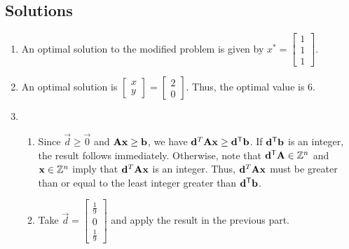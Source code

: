 \subsection*{Solutions}\label{solutions-10}

\begin{enumerate}
\def\labelenumi{\arabic{enumi}.}
\item
  An optimal solution to the modified problem is given by
  \(x^* = \begin{bmatrix} 1\\1\\1 \end{bmatrix}\).
\item
  An optimal solution is
  \(\begin{bmatrix} x\\y \end{bmatrix} = \begin{bmatrix} 2 \\ 0\end{bmatrix}\).
  Thus, the optimal value is \(6\).
\item
  \begin{enumerate}
  \def\labelenumii{\alph{enumii}.}
  \item
    Since \(\vec{d} \geq \vec{0}\) and \(\mathbf{A}\mathbf{x} \geq \mathbf{b}\),
    we have \(\mathbf{d}^T\mathbf{A} \mathbf{x} \geq \mathbf{d}^{\mathsf{T}}\mathbf{b}\). If
    \(\mathbf{d}^{\mathsf{T}}\mathbf{b}\) is an integer, the result follows immediately.
    Otherwise, note that \(\mathbf{d}^{\mathsf{T}}\mathbf{A} \in {\mathbb{Z}}^n\) and
    \(\mathbf{x}\in {\mathbb{Z}}^n\) imply that \(\mathbf{d}^T\mathbf{A} \mathbf{x}\) is an
    integer. Thus, \(\mathbf{d}^T\mathbf{A} \mathbf{x}\) must be greater than or
    equal to the least integer greater than \(\mathbf{d}^{\mathsf{T}}\mathbf{b}\).
  \item
    Take
    \(\vec{d} = \begin{bmatrix} \frac{1}{9} \\ 0 \\ \frac{1}{9} \end{bmatrix}\)
    and apply the result in the previous part.
  \end{enumerate}
\end{enumerate}


